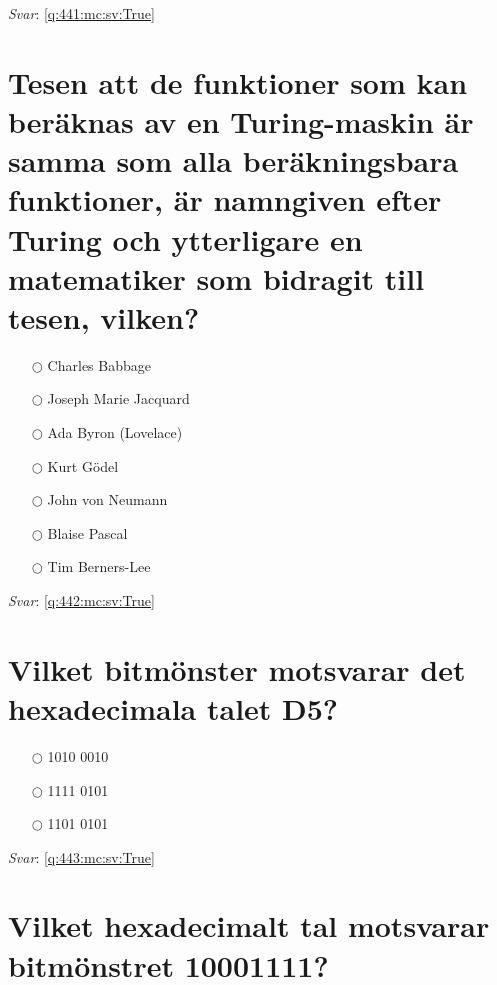 \documentclass[a4paper,11pt,oneside]{book}
\begin{document}
\begin{sloppypar}
\textit{Svar}: \autoref{q:441:mc:sv:True}



\section{Tesen att de funktioner som kan ber\"aknas av en Turing-maskin \"ar samma som alla ber\"akningsbara funktioner, \"ar namngiven efter Turing och ytterligare en matematiker som bidragit till tesen, vilken?}

\label{q:442:mc:sv:False}

\begin{itemize}
  \item[$\bigcirc$] Charles Babbage
  \item[$\bigcirc$] Joseph Marie Jacquard
  \item[$\bigcirc$] Ada Byron (Lovelace)
  \item[$\bigcirc$] Kurt G\"odel
  \item[$\bigcirc$] John von Neumann
  \item[$\bigcirc$] Blaise Pascal
  \item[$\bigcirc$] Tim Berners-Lee
\end{itemize}

\vspace{1cm}

\textit{Svar}: \autoref{q:442:mc:sv:True}



\section{Vilket bitm\"onster motsvarar det hexadecimala talet D5?}

\label{q:443:mc:sv:False}

\begin{itemize}
  \item[$\bigcirc$] 1010 0010
  \item[$\bigcirc$] 1111 0101
  \item[$\bigcirc$] 1101 0101
\end{itemize}

\vspace{1cm}

\textit{Svar}: \autoref{q:443:mc:sv:True}



\section{Vilket hexadecimalt tal motsvarar bitm\"onstret 10001111?}


\end{sloppypar}
\end{document}
